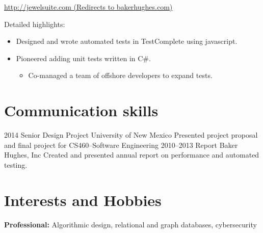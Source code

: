 \documentclass[]{friggeri-cv} %
\begin{document}
\begin{entrylist}
{\begin{center}
	\href{http://jewelsuite.com}{http://jewelsuite.com (Redirects to bakerhughes.com)}
\end{center}
Detailed highlights:
\begin{itemize}
\item Designed and wrote automated tests in TestComplete using javascript.
\item Pioneered adding unit tests written in C\#.
\begin{itemize}
	\item Co-managed a team of offshore developers to expand tests.
\end{itemize}
\end{itemize}
}
\end{entrylist}


\section{Communication skills}

\begin{entrylist}
\entry
{2014}
{Senior Design Project}
{University of New Mexico}
{Presented project proposal and final project for CS460--Software Engineering}
\entry
{2010--2013}
{Report}
{Baker Hughes, Inc}
{Created and presented annual report on performance and automated testing.}
 \end{entrylist}


\section{Interests and Hobbies}

\textbf{Professional:} Algorithmic design, relational and graph databases, cybersecurity
\end{document}
